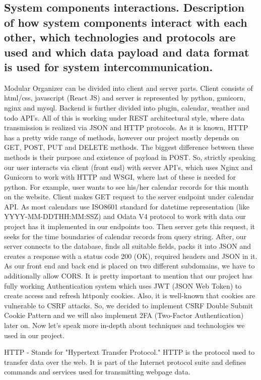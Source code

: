 \subsection{System components interactions. Description of how system components interact with each other, which technologies and protocols are used and which data payload and data format is used for system intercommunication. }
\par Modular Organizer can be divided into client and server parts. Client consists of html/css, javascript (React JS) and server is represented by python, gunicorn, nginx and mysql. Backend is further divided into plugin, calendar, weather and todo API’s. All of this is working under REST architectural style, where data transmission is realized via JSON and HTTP protocols. As it is known, HTTP has a pretty wide range of methods, however our project mostly depends on GET, POST, PUT and DELETE methods. The biggest difference between these methods is their purpose and existence of payload in POST. So, strictly speaking our user interacts via client (front end) with server API’s, which uses Nginx and Gunicorn to work with HTTP and WSGI, where last of these is needed for python. For example, user wants to see his/her calendar records for this month on the website. Client makes GET request to the server endpoint under calendar API. As most calendars use ISO8601 standard for datetime representation (like YYYY-MM-DDTHH:MM:SSZ) and Odata V4 protocol to work with data our project has it implemented in our endpoints too. Then server gets this request, it seeks for the time boundaries of calendar records from query string. After, our server connects to the database, finds all suitable fields, packs it into JSON and creates a response with a status code 200 (OK), required headers and JSON in it. As our front end and back end is placed on two different subdomains, we have to additionally allow CORS. It is pretty important to mention that our project has fully working Authentication system which uses JWT (JSON Web Token) to create access and refresh httponly cookies. Also, it is well-known that cookies are vulnerable to CSRF attacks. So, we decided to implement CSRF Double Submit Cookie Pattern and we will also implement 2FA (Two-Factor Authentication) later on. Now let's speak more in-depth about techniques and technologies we used in our project. 
\par HTTP - Stands for "Hypertext Transfer Protocol." HTTP is the protocol used to transfer data over the web. It is part of the Internet protocol suite and defines commands and services used for transmitting webpage data.
